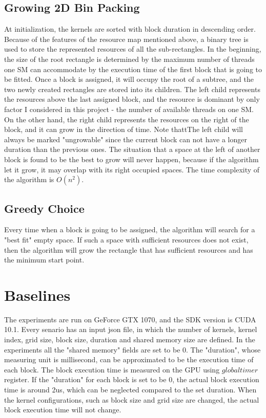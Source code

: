\documentclass[12pt,journal,compsoc]{IEEEtran}
\begin{document}
\subsection{Growing 2D Bin Packing}
At initialization, the kernels are sorted with block duration in descending order. Because of the features of the resource map mentioned above, a binary tree is used to store the represented resources of all the sub-rectangles. In the beginning, the size of the root rectangle is determined by the maximum number of threads one SM can accommodate by the execution time of the first block that is going to be fitted. Once a block is assigned, it will occupy the root of a subtree, and the two newly created rectangles are stored into its children. The left child represents the resources above the last assigned block, and the resource is dominant by only factor I considered in this project - the number of available threads on one SM. On the other hand, the right child represents the resources on the right of the block, and it can grow in the direction of time. Note thattThe left child will always be marked "ungrowable" since the current block can not have a longer duration than the previous ones. The situation that a space at the left of another block is found to be the best to grow will never happen, because if the algorithm let it grow, it may overlap with its right occupied spaces. The time complexity of the algorithm is $O(n^2)$.
\subsection{Greedy Choice}
Every time when a block is going to be assigned, the algorithm will search for a "best fit" empty space. If such a space with sufficient resources does not exist, then the algorithm will grow the rectangle that has sufficient resources and has the minimum start point.


\section{Baselines}
The experiments are run on GeForce GTX 1070, and the SDK version is CUDA 10.1. Every senario has an input json file, in which the number of kernels, kernel index, grid size, block size, duration and shared memory size are defined. In the experiments all the "shared memory" fields are set to be 0. The "duration", whose measuring unit is millisecond, can be approximated to be the execution time of each block. The block execution time is measured on the GPU using $globaltimer$ register. If the "duration" for each block is set to be 0, the actual block execution time is around 2us, which can be neglected compared to the set duration. When the kernel configurations, such as block size and grid size are changed, the actual block execution time will not change.
\end{document}
